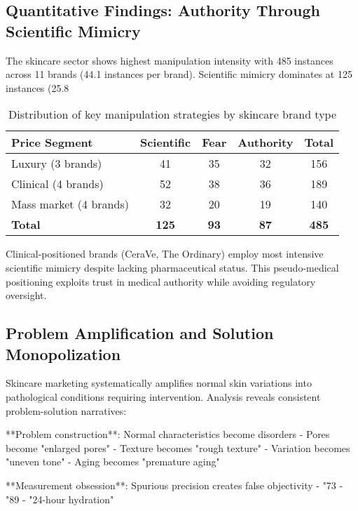 \subsection{Quantitative Findings: Authority Through Scientific Mimicry}

The skincare sector shows highest manipulation intensity with 485 instances across 11 brands (44.1 instances per brand). Scientific mimicry dominates at 125 instances (25.8%

\begin{table}[h]
\centering
\begin{tabular}{|l|c|c|c|c|}
\hline
\textbf{Price Segment} & \textbf{Scientific} & \textbf{Fear} & \textbf{Authority} & \textbf{Total} \\
\hline
Luxury (3 brands) & 41 & 35 & 32 & 156 \\
Clinical (4 brands) & 52 & 38 & 36 & 189 \\
Mass market (4 brands) & 32 & 20 & 19 & 140 \\
\hline
\textbf{Total} & \textbf{125} & \textbf{93} & \textbf{87} & \textbf{485} \\
\hline
\end{tabular}
\caption{Distribution of key manipulation strategies by skincare brand type}
\end{table}

Clinical-positioned brands (CeraVe, The Ordinary) employ most intensive scientific mimicry despite lacking pharmaceutical status. This pseudo-medical positioning exploits trust in medical authority while avoiding regulatory oversight.

\subsection{Problem Amplification and Solution Monopolization}

Skincare marketing systematically amplifies normal skin variations into pathological conditions requiring intervention. Analysis reveals consistent problem-solution narratives:

**Problem construction**: Normal characteristics become disorders
- Pores become "enlarged pores"
- Texture becomes "rough texture"
- Variation becomes "uneven tone"
- Aging becomes "premature aging"

**Measurement obsession**: Spurious precision creates false objectivity
- "73%
- "89%
- "24-hour hydration"

